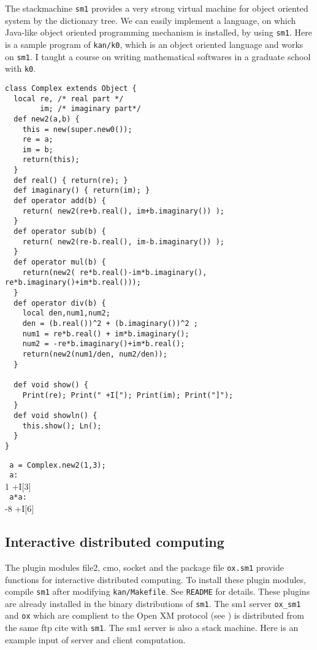 \documentclass{article}
\begin{document}
The stackmachine {\tt sm1} provides a very strong virtual machine for
object oriented system by the dictionary tree.
We can easily implement a language, on which Java-like object 
oriented programming mechanism is installed,
by using {\tt sm1}.
Here is a sample program of {\tt kan/k0}, which is an object oriented
language and works on {\tt sm1}.
I taught a course on writing mathematical softwares
in a graduate school with {\tt k0}.
\begin{verbatim}
class Complex extends Object {
  local re, /* real part */
        im; /* imaginary part*/
  def new2(a,b) {
    this = new(super.new0());
    re = a;
    im = b;
    return(this);
  }
  def real() { return(re); }
  def imaginary() { return(im); }
  def operator add(b) {
    return( new2(re+b.real(), im+b.imaginary()) );
  }
  def operator sub(b) {
    return( new2(re-b.real(), im-b.imaginary()) );
  }
  def operator mul(b) {
    return(new2( re*b.real()-im*b.imaginary(), re*b.imaginary()+im*b.real()));
  }
  def operator div(b) {
    local den,num1,num2;
    den = (b.real())^2 + (b.imaginary())^2 ;
    num1 = re*b.real() + im*b.imaginary();
    num2 = -re*b.imaginary()+im*b.real();
    return(new2(num1/den, num2/den));
  }

  def void show() {
    Print(re); Print(" +I["); Print(im); Print("]");
  }
  def void showln() {
    this.show(); Ln();
  }
}

\end{verbatim}
\verb! a = Complex.new2(1,3); ! \\
\verb! a: ! \\
1 +I[3]  \\
\verb! a*a: ! \\
-8 +I[6]  \\



\subsection{Interactive distributed computing}

The plugin modules file2, cmo, socket and the package file
{\tt ox.sm1} provide functions for 
interactive distributed computing.
To install these plugin modules, compile {\tt sm1} after modifying 
{\tt kan/Makefile}.
See {\tt README} for details.
These plugins are already installed in the binary distributions of {\tt sm1}.
The sm1 server {\tt ox\_sm1} and {\tt ox} which are complient to the Open XM
protocol
(see \cite{openxxx})
is distributed from the same ftp cite with {\tt sm1}.
The sm1 server is also a stack machine.
Here is an example input of server and client computation.
\end{document}
